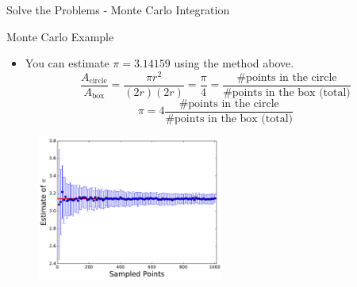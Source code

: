 \documentclass{beamer}
\begin{document}
\begin{frame}{Solve the Problems - Monte Carlo Integration}
{\begin{textblock*}{\textwidth}
\begin{figure}[h]
\end{figure}
\end{textblock*}
}
\vspace{5.5cm}
\end{frame}

\begin{frame}{Monte Carlo Example}
\begin{itemize}
   \item You can estimate $\pi=3.14159$ using the method above.
\begin{equation*}
   \frac{A_\text{circle}}{A_\text{box}} = \frac{\pi r^2}{(2r)(2r)} = \frac{\pi}{4} = \frac{\text{\# points in the circle}}{\text{\# points in the box (total)}}
\end{equation*}
\begin{equation*}
   \pi=4\frac{\text{\# points in the circle}}{\text{\# points in the box (total)}}
\end{equation*}
\end{itemize}
\begin{figure}[h]
   \includegraphics[width=0.55\textwidth]{figures/pi_estimate.pdf}
\end{figure}
\end{frame}
\end{document}
